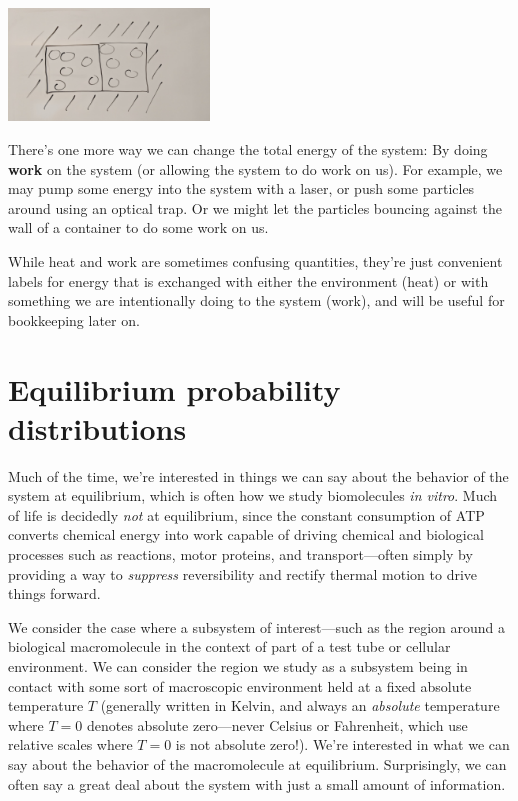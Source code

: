 \documentclass[english,course]{lecture}
\begin{document}
\begin{centering}
\includegraphics[width=0.4\textwidth]{figures/system-in-contact.jpg}

\end{centering}

There's one more way we can change the total energy of the system: By doing {\bf work} on the system (or allowing the system to do work on us).
For example, we may pump some energy into the system with a laser, or push some particles around using an optical trap.
Or we might let the particles bouncing against the wall of a container to do some work on us.

While heat and work are sometimes confusing quantities, they're just convenient labels for energy that is exchanged with either the environment (heat) or with something we are intentionally doing to the system (work), and will be useful for bookkeeping later on.


\section{Equilibrium probability distributions} 

Much of the time, we're interested in things we can say about the behavior of the system at equilibrium, which is often how we study biomolecules \emph{in vitro}.
Much of life is decidedly \emph{not} at equilibrium, since the constant consumption of ATP converts chemical energy into work capable of driving chemical and biological processes such as reactions, motor proteins, and transport---often simply by providing a way to \emph{suppress} reversibility and rectify thermal motion to drive things forward.

We consider the case where a subsystem of interest---such as the region around a biological macromolecule in the context of part of a test tube or cellular environment.
We can consider the region we study as a subsystem being in contact with some sort of macroscopic environment held at a fixed absolute temperature $T$ (generally written in Kelvin, and always an \emph{absolute} temperature where $T = 0$ denotes absolute zero---never Celsius or Fahrenheit, which use relative scales where $T = 0$ is not absolute zero!).
We're interested in what we can say about the behavior of the macromolecule at equilibrium.
Surprisingly, we can often say a great deal about the system with just a small amount of information.
\end{document}
